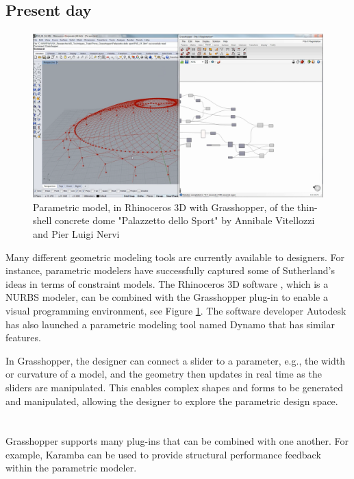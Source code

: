 \subsection{Present day}

\begin{figure}
  \includegraphics[width=380pt]{graphics/parametric-model.png}
  \caption{Parametric model, in Rhinoceros 3D with Grasshopper, of the thin-shell concrete dome "Palazzetto dello Sport" by Annibale Vitellozzi and Pier Luigi Nervi}
  \label{fig:parametric-model}
\end{figure}

Many different geometric modeling tools are currently available to designers. For instance, parametric modelers have successfully captured some of Sutherland’s ideas in terms of constraint models. The Rhinoceros 3D software \cite{Rhino}, which is a NURBS  modeler, can be combined with the Grasshopper plug-in \cite{Grasshopper} to enable a visual programming environment, see Figure \ref{fig:parametric-model}. The software developer Autodesk has also launched a parametric modeling tool named Dynamo \cite{Dynamo} that has similar features.

In Grasshopper, the designer can connect a slider to a parameter, e.g., the width or curvature of a model, and the geometry then updates in real time as the sliders are manipulated. This enables complex shapes and forms to be generated and manipulated, allowing the designer to explore the parametric design space. 
 \\ \\ \\
Grasshopper supports many plug-ins that can be combined with one another. For example, Karamba \cite{Karamba} can be used to provide structural performance feedback within the parametric modeler. 


